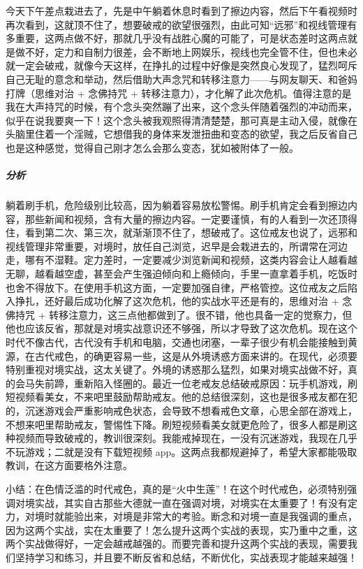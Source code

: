 \begin{case}
    今天下午差点栽进去了，先是中午躺着休息时看到了擦边内容，然后下午看视频时再次看到，这就顶不住了，想要破戒的欲望很强烈，由此可知“远邪”和视线管理有多重要，这两点做不好，那就几乎没有战胜心魔的可能了，可是状态差时这两点就是做不好，定力和自制力很差，会不断地上网娱乐，视线也完全管不住，但也未必就一定会破戒，就像今天这样，在挣扎的过程中好像是突然良心发现了，猛烈呵斥自己无耻的意念和举动，然后借助大声念咒和转移注意力——与网友聊天、和爸妈打牌（思维对治 + 念佛持咒 + 转移注意力），才化解了此次危机。值得注意的是我在大声持咒的时候，有个念头突然蹦了出来，这个念头伴随着强烈的冲动而来，似乎在说我要爽一下！这个念头被我观照得清清楚楚，那可真是主动入侵，就像在头脑里住着一个淫贼，它想借我的身体来发泄扭曲和变态的欲望，我之后反省自己也是这种感觉，觉得自己刚才怎么会那么变态，犹如被附体了一般。
    \subparagraph{分析} 躺着刷手机，危险级别比较高，因为躺着容易放松警惕。刷手机肯定会看到擦边内容，那些新闻和视频，含有大量的擦边内容。一定要谨慎，有的人看到一次还顶得住，看到第二次、第三次，就渐渐顶不住了，想破戒了。这位戒友也说了，远邪和视线管理非常重要，对境时，放任自己浏览，迟早是会栽进去的，所谓常在河边走，哪有不湿鞋。定力差时，一定要减少浏览新闻和视频，这类内容会让人越看越无聊，越看越空虚，甚至会产生强迫倾向和上瘾倾向，手里一直拿着手机，吃饭时也舍不得放下。在使用手机这方面，一定要加强自律，严格管控。这位戒友之后陷入挣扎，还好最后成功化解了这次危机，他的实战水平还是有的，思维对治 + 念佛持咒 + 转移注意力，这三点他都做到了。很不错，他也具备一定的觉察力，但他也应该反省，那就是对境实战意识还不够强，所以才导致了这次危机。现在这个时代不像古代，古代没有手机和电脑，交通也闭塞，一辈子很少有机会能接触到黄源，在古代戒色，的确更容易一些，这是从外境诱惑方面来讲的。在现代，必须要特别重视对境实战，这太关键了。外境的诱惑那么猛烈，如果对境实战做不好，真的会马失前蹄，重新陷入怪圈的。最近一位老戒友总结破戒原因：玩手机游戏，刷短视频看美女，不来吧里鼓励帮助戒友。他的总结很深刻，这也是很多戒友都在犯的，沉迷游戏会严重影响戒色状态，会导致不想看戒色文章，心思全部在游戏上，不想来吧里帮助戒友，警惕性下降。刷短视频看美女就更危险了，很多人都是刷这种视频而导致破戒的，教训很深刻。我能戒掉现在，一没有沉迷游戏，我现在几乎不玩游戏；二就是没有下载短视频 app。这两点我都规避掉了，希望大家都能吸取教训，在这方面要格外注意。
\end{case}

小结：在色情泛滥的时代戒色，真的是“火中生莲”！在这个时代戒色，必须特别强调对境实战，其实自古那些大德就一直在强调对境，对境实在太重要了！有没有定力，对境时就能验出来，对境是非常大的考验。断念和对境一直是我强调的重点，因为这两个实战，实在太重要了！怎么提升这两个实战的表现，实乃重中之重，这两个实战做得好，一定会越戒越强的。而要完善和提升这两个实战的表现，需要我们坚持学习和练习，并且要不断反省和总结，不断优化，实战表现才能越来越强！

